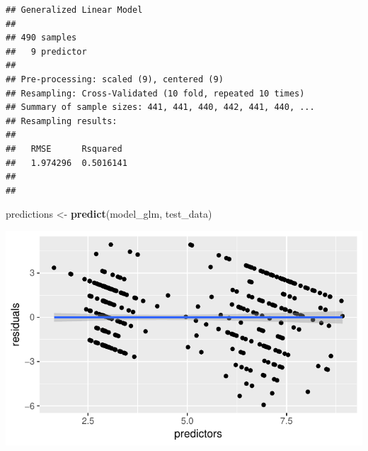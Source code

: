 \documentclass[]{article}
\newenvironment{Shaded}{\begin{snugshade}}{\end{snugshade}}
\newcommand{\KeywordTok}[1]{\textcolor[rgb]{0.13,0.29,0.53}{\textbf{{#1}}}}
\newcommand{\DataTypeTok}[1]{\textcolor[rgb]{0.13,0.29,0.53}{{#1}}}
\newcommand{\StringTok}[1]{\textcolor[rgb]{0.31,0.60,0.02}{{#1}}}
\newcommand{\CommentTok}[1]{\textcolor[rgb]{0.56,0.35,0.01}{\textit{{#1}}}}
\newcommand{\NormalTok}[1]{{#1}}
\begin{document}
\begin{verbatim}
## Generalized Linear Model 
## 
## 490 samples
##   9 predictor
## 
## Pre-processing: scaled (9), centered (9) 
## Resampling: Cross-Validated (10 fold, repeated 10 times) 
## Summary of sample sizes: 441, 441, 440, 442, 441, 440, ... 
## Resampling results:
## 
##   RMSE      Rsquared 
##   1.974296  0.5016141
## 
## 
\end{verbatim}

\begin{Shaded}
\begin{Highlighting}[]
\NormalTok{predictions <-}\StringTok{ }\KeywordTok{predict}\NormalTok{(model_glm, test_data)}
\end{Highlighting}
\end{Shaded}

\begin{Shaded}
\end{Shaded}

\begin{center}\includegraphics{webinar_code_files/figure-latex/residuals-1} \end{center}
\end{document}
